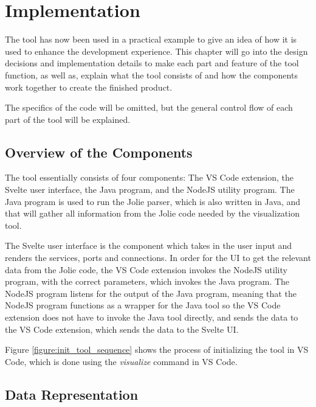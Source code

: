 \chapter{Implementation}
The tool has now been used in a practical example to give an idea of how it is used to enhance the development experience.
This chapter will go into the design decisions and implementation details to make each part and feature of the tool function, as well as,
explain what the tool consists of and how the components work together to create the finished product.

The specifics of the code will be omitted, but the general control flow of each part of the tool will be explained.

\section{Overview of the Components}
The tool essentially consists of four components: The VS Code extension, the Svelte user interface, the Java program, and the NodeJS utility program.
The Java program is used to run the Jolie parser, which is also written in Java, and that will gather all information from the Jolie code needed by the visualization tool.

The Svelte user interface is the component which takes in the user input and renders the services, ports and connections.
In order for the UI to get the relevant data from the Jolie code, the VS Code extension invokes the NodeJS utility program, with the correct parameters, which invokes the Java program.
The NodeJS program listens for the output of the Java program,
meaning that the NodeJS program functions as a wrapper for the Java tool so the VS Code extension does not have to invoke the Java tool directly,
and sends the data to the VS Code extension, which sends the data to the Svelte UI.

Figure \ref*{figure:init_tool_sequence} shows the process of initializing the tool in VS Code, which is done using the \textit{visualize} command in VS Code.

\clearpage
\section{Data Representation}

